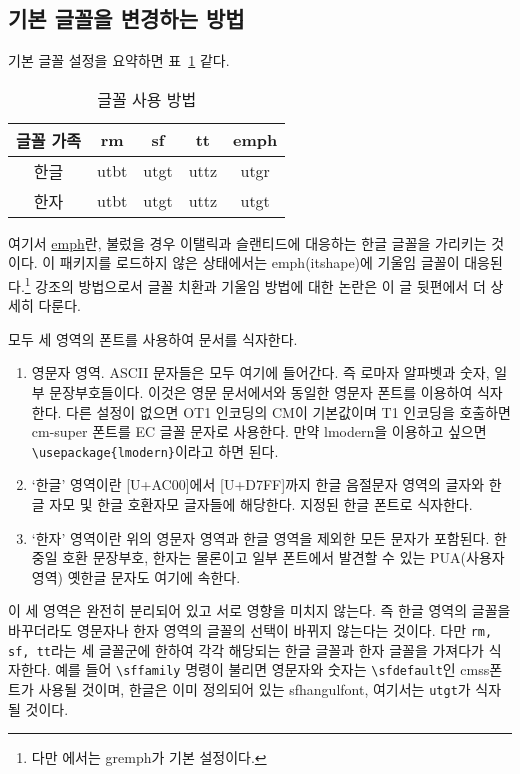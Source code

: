 \subsection{기본 글꼴을 변경하는 방법}

 기본 글꼴 설정을 요약하면 표~\ref{tab:usefont}\와
같다.

\begin{table}
\centering\caption{글꼴 사용 방법}\label{tab:usefont}
\medskip
\begin{tabular}{c|ccc|c}
\hline
글꼴 가족 & rm & sf & tt & emph \\
\hline
한글 & utbt & utgt & uttz & utgr \\
한자 & utbt & utgt & uttz & utgt \\
\hline
\end{tabular}
\end{table}

여기서 \uline{emph}란, \를 불렀을 경우
이탤릭과 슬랜티드에 대응하는 한글 글꼴을 가리키는 것이다.
이 패키지를 로드하지 않은 상태에서는 emph(itshape)에 기울임 글꼴이
대응된다.\footnote{%
  다만 에서는 gremph가 기본 설정이다.}
강조의 방법으로서 글꼴 치환과 기울임 방법에 대한 논란은 이 글
뒷편에서 더 상세히 다룬다. 

 모두 세 영역의 폰트를 사용하여 문서를 식자한다.
\begin{enumerate}
\item 영문자 영역. ASCII 문자들은 모두 여기에 들어간다. 즉
로마자 알파벳과 숫자, 일부 문장부호들이다. 이것은 영문 문서에서와
동일한 영문자 폰트를 이용하여 식자한다. 다른 설정이 없으면 OT1 인코딩의
CM이 기본값이며 T1 인코딩을 호출하면 cm-super 폰트를 EC 글꼴 문자로
사용한다. 만약 lmodern을 이용하고 싶으면 \verb|\usepackage{lmodern}|이라고
하면 된다.

\item `한글' 영역이란 [U+AC00]에서 [U+D7FF]까지 한글 음절문자 영역의
글자와 한글 자모 및 한글 호환자모 글자들에 해당한다. 지정된 한글 폰트로
식자한다.

\item `한자' 영역이란 위의 영문자 영역과 한글 영역을 제외한 모든
문자가 포함된다. 한중일 호환 문장부호, 한자는 물론이고 일부 폰트에서
발견할 수 있는 PUA(사용자 영역) 옛한글 문자도 여기에 속한다.
\end{enumerate}
이 세 영역은 완전히 분리되어 있고 서로 영향을 미치지 않는다. 즉
한글 영역의 글꼴을 바꾸더라도 영문자나 한자 영역의 글꼴의 선택이
바뀌지 않는다는 것이다. 다만 \texttt{rm, sf, tt}라는 세 글꼴군에 한하여
각각 해당되는 한글 글꼴과 한자 글꼴을 가져다가 식자한다. 
예를 들어 \verb|\sffamily| 명령이 불리면
영문자와 숫자는 \verb|\sfdefault|인 cmss폰트가 사용될 것이며,
한글은 이미 정의되어 있는 sfhangulfont, 여기서는 \texttt{utgt}가
식자될 것이다. 

